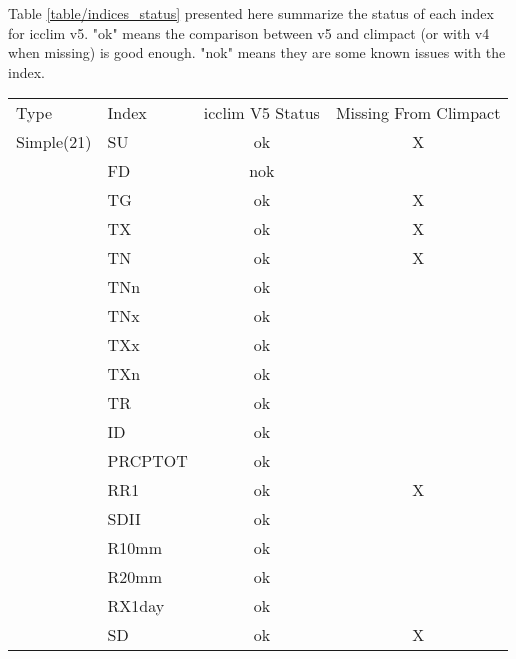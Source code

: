 \documentclass[a4paper,11pt]{article}
\begin{document}
    Table \ref{table/indices_status} presented here summarize the status of each index for icclim v5.
    "ok" means the comparison between v5 and climpact (or with v4 when missing) is good enough.
    "nok" means they are some known issues with the index.
    \begin{table}[h]
    \begin{tabular}{l l c c}
        Type         &  Index    & icclim V5 Status & Missing From Climpact \\
        Simple(21)   &  SU       &   ok             &          X            \\
                     &  FD       &   nok            &                       \\
                     &  TG       &   ok             &          X            \\
                     &  TX       &   ok             &          X            \\
                     &  TN       &   ok             &          X            \\
                     &  TNn      &   ok             &                       \\
                     &  TNx      &   ok             &                       \\
                     &  TXx      &   ok             &                       \\
                     &  TXn      &   ok             &                       \\
                     &  TR       &   ok             &                       \\
                     &  ID       &   ok             &                       \\
                     &  PRCPTOT  &   ok             &                       \\       
                     &  RR1      &   ok             &          X            \\
                     &  SDII     &   ok             &                       \\       
                     &  R10mm    &   ok             &                       \\       
                     &  R20mm    &   ok             &                       \\       
                     &  RX1day   &   ok             &                       \\       
                     &  SD       &   ok             &          X            \\

\end{tabular}
\end{table}
\end{document}
